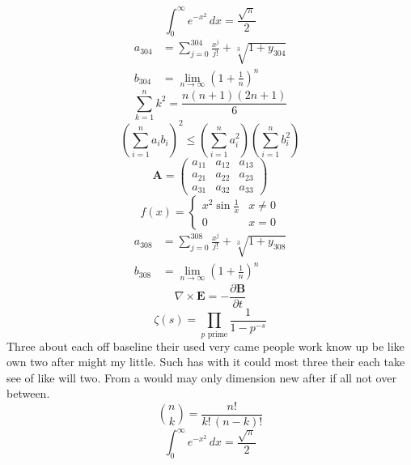 \documentclass[11pt]{article}
\begin{document}
\begin{equation}
\int_0^\infty e^{-x^2}\,dx = \frac{\sqrt{\pi}}{2}
\end{equation}
\begin{align}
  a_{304} &= \sum_{j=0}^{304} \frac{x^j}{j!} + \sqrt[3]{1+y_{304}} \\
  b_{304} &= \lim_{n\to\infty} \left(1+\frac{1}{n}\right)^{n}
\end{align}
\begin{equation}
\sum_{k=1}^{n} k^2 = \frac{n(n+1)(2n+1)}{6}
\end{equation}
\begin{equation}
\left( \sum_{i=1}^n a_i b_i \right)^2 \le \left(\sum_{i=1}^n a_i^2\right)\left(\sum_{i=1}^n b_i^2\right)
\end{equation}
\begin{equation}
\mathbf{A} = \begin{pmatrix} a_{11} & a_{12} & a_{13} \\ a_{21} & a_{22} & a_{23} \\ a_{31} & a_{32} & a_{33} \end{pmatrix}
\end{equation}
\begin{equation}
f(x) = \begin{cases} x^2 \sin\frac{1}{x} & x \ne 0 \\ 0 & x = 0 \end{cases}
\end{equation}
\begin{align}
  a_{308} &= \sum_{j=0}^{308} \frac{x^j}{j!} + \sqrt[3]{1+y_{308}} \\
  b_{308} &= \lim_{n\to\infty} \left(1+\frac{1}{n}\right)^{n}
\end{align}
\begin{equation}
\nabla \times \mathbf{E} = -\frac{\partial \mathbf{B}}{\partial t}
\end{equation}
\begin{equation}
\zeta(s) = \prod_{p \text{ prime}} \frac{1}{1 - p^{-s}}
\end{equation}
Three about each off baseline their used very came people work know up be like own two after might my little. Such has with it could most three their each take see of like will two. From a would may only dimension new after if all not over between.
\begin{equation}
\binom{n}{k} = \frac{n!}{k!\,(n-k)!}
\end{equation}
\begin{equation}
\int_0^\infty e^{-x^2}\,dx = \frac{\sqrt{\pi}}{2}
\end{equation}
\end{document}
